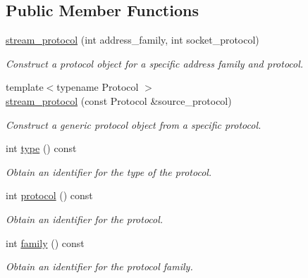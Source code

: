 \subsection*{Public Member Functions}
\begin{DoxyCompactItemize}
\item 
\hyperlink{classasio_1_1generic_1_1stream__protocol_aadcf2d5a99b518a537d7ab6d618a217a}{stream\+\_\+protocol} (int address\+\_\+family, int socket\+\_\+protocol)
\begin{DoxyCompactList}\small\item\em Construct a protocol object for a specific address family and protocol. \end{DoxyCompactList}\item 
{\footnotesize template$<$typename Protocol $>$ }\\\hyperlink{classasio_1_1generic_1_1stream__protocol_a5dbcb247a6ab11567f5e730946e46ddd}{stream\+\_\+protocol} (const Protocol \&source\+\_\+protocol)
\begin{DoxyCompactList}\small\item\em Construct a generic protocol object from a specific protocol. \end{DoxyCompactList}\item 
int \hyperlink{classasio_1_1generic_1_1stream__protocol_a1a1b7c6eb0d736ffa937eb76448a107b}{type} () const 
\begin{DoxyCompactList}\small\item\em Obtain an identifier for the type of the protocol. \end{DoxyCompactList}\item 
int \hyperlink{classasio_1_1generic_1_1stream__protocol_a577ec8fb89622e0d2cf7d6547444f0cc}{protocol} () const 
\begin{DoxyCompactList}\small\item\em Obtain an identifier for the protocol. \end{DoxyCompactList}\item 
int \hyperlink{classasio_1_1generic_1_1stream__protocol_a9c14694ec8a2996d37945a47c41dd4b9}{family} () const 
\begin{DoxyCompactList}\small\item\em Obtain an identifier for the protocol family. \end{DoxyCompactList}\end{DoxyCompactItemize}
